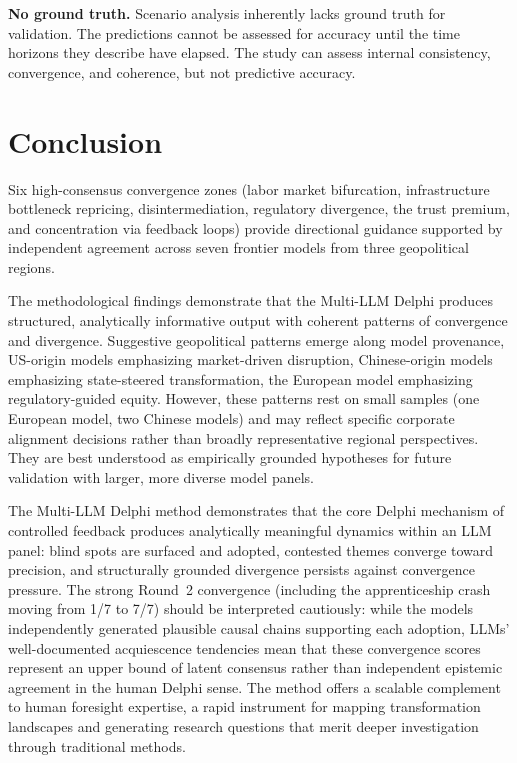 \documentclass[preprint,review,12pt]{elsarticle}
\begin{document}
\textbf{No ground truth.} Scenario analysis inherently lacks ground truth for validation. The predictions cannot be assessed for accuracy until the time horizons they describe have elapsed. The study can assess internal consistency, convergence, and coherence, but not predictive accuracy.



\section{Conclusion}
\label{sec:conclusion}

Six high-consensus convergence zones (labor market bifurcation, infrastructure bottleneck repricing, disintermediation, regulatory divergence, the trust premium, and concentration via feedback loops) provide directional guidance supported by independent agreement across seven frontier models from three geopolitical regions.

The methodological findings demonstrate that the Multi-LLM Delphi produces structured, analytically informative output with coherent patterns of convergence and divergence. Suggestive geopolitical patterns emerge along model provenance, US-origin models emphasizing market-driven disruption, Chinese-origin models emphasizing state-steered transformation, the European model emphasizing regulatory-guided equity. However, these patterns rest on small samples (one European model, two Chinese models) and may reflect specific corporate alignment decisions rather than broadly representative regional perspectives. They are best understood as empirically grounded hypotheses for future validation with larger, more diverse model panels.

The Multi-LLM Delphi method demonstrates that the core Delphi mechanism of controlled feedback produces analytically meaningful dynamics within an LLM panel: blind spots are surfaced and adopted, contested themes converge toward precision, and structurally grounded divergence persists against convergence pressure. The strong Round~2 convergence (including the apprenticeship crash moving from 1/7 to 7/7) should be interpreted cautiously: while the models independently generated plausible causal chains supporting each adoption, LLMs' well-documented acquiescence tendencies mean that these convergence scores represent an upper bound of latent consensus rather than independent epistemic agreement in the human Delphi sense. The method offers a scalable complement to human foresight expertise, a rapid instrument for mapping transformation landscapes and generating research questions that merit deeper investigation through traditional methods.
\end{document}

